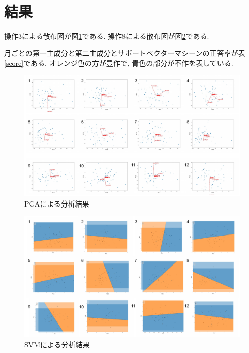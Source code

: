 \documentclass{jarticle}
\begin{document}
\hypertarget{header-n2048}{%
\section{結果}\label{header-n2048}}

操作3による散布図が図\ref{pca}である. 操作8による散布図が図\ref{svm}である.

月ごとの第一主成分と第二主成分とサポートベクターマシーンの正答率が表\ref{score}である.
オレンジ色の方が豊作で, 青色の部分が不作を表している.

\begin{figure}[H]
\centering
\includegraphics[keepaspectratio, scale=0.56]
{pca_plot.pdf}
\caption{PCAによる分析結果}
\label{pca}
\end{figure}



\begin{figure}[H]
\centering
\includegraphics[keepaspectratio, scale=0.56]
{svm_plot.pdf}
\caption{SVMによる分析結果}
\label{svm}
\end{figure}
\end{document}
